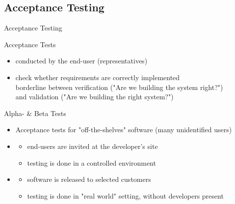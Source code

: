 \subsection{Acceptance Testing}
\begin{frame}{Acceptance Testing}
  \begin{block}{Acceptance Tests}
    \begin{itemize}
    \item conducted by the end-user (representatives)
    \item check whether requirements are correctly implemented\\
      {\small borderline between verification ("Are we building the system 
        right?")\\
        and validation ("Are we building the right system?")}
    \end{itemize}
  \end{block}

  \begin{block}{Alpha- \& Beta Tests}
    \begin{itemize}
    \item Acceptance tests for "off-the-shelves" software (many unidentified users)
    \item {}
      \begin{itemize}
      \item end-users are invited at the developer's site
      \item testing is done in a controlled environment
      \end{itemize}
    \item {}
      \begin{itemize}
      \item software is released to selected customers
      \item testing is done in "real world" setting, without developers present
      \end{itemize}
    \end{itemize}
  \end{block}
\end{frame}
